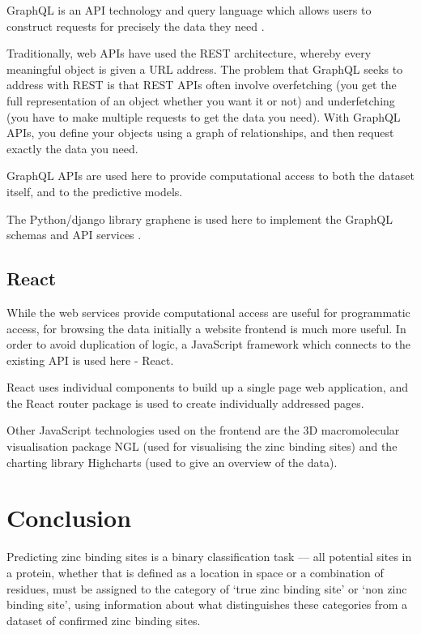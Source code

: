 GraphQL is an API technology and query language which allows users to construct requests for precisely the data they need \cite{graphql}.

Traditionally, web APIs have used the REST architecture, whereby every meaningful object is given a URL address. The problem that GraphQL seeks to address with REST is that REST APIs often involve overfetching (you get the full representation of an object whether you want it or not) and underfetching (you have to make multiple requests to get the data you need). With GraphQL APIs, you define your objects using a graph of relationships, and then request exactly the data you need.

GraphQL APIs are used here to provide computational access to both the dataset itself, and to the predictive models.

The Python/django library graphene is used here to implement the GraphQL schemas and API services \cite{graphene}.

\subsection{React}

While the web services provide computational access are useful for programmatic access, for browsing the data initially a website frontend is much more useful. In order to avoid duplication of logic, a JavaScript framework which connects to the existing API is used here - React.

React uses individual components to build up a single page web application, and the React router package is used to create individually addressed pages.

Other JavaScript technologies used on the frontend are the 3D macromolecular visualisation package NGL (used for visualising the zinc binding sites) \cite{rose2015ngl} and the charting library Highcharts (used to give an overview of the data).

\section{Conclusion}

Predicting zinc binding sites is a binary classification task --- all potential sites in a protein, whether that is defined as a location in space or a combination of residues, must be assigned to the category of `true zinc binding site' or `non zinc binding site', using information about what distinguishes these categories from a dataset of confirmed zinc binding sites.

